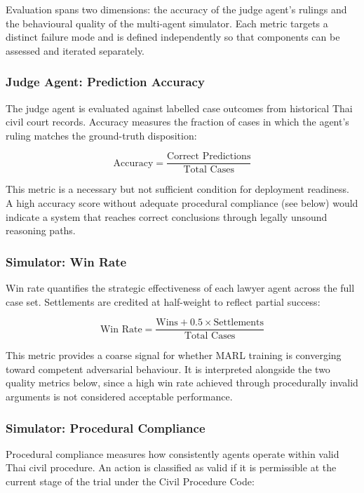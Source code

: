 Evaluation spans two dimensions: the accuracy of the judge agent's rulings and the behavioural quality of the multi-agent simulator. Each metric targets a distinct failure mode and is defined independently so that components can be assessed and iterated separately.

\subsubsection*{Judge Agent: Prediction Accuracy}

The judge agent is evaluated against labelled case outcomes from historical Thai civil court records. Accuracy measures the fraction of cases in which the agent's ruling matches the ground-truth disposition:

\[
\text{Accuracy} = \frac{\text{Correct Predictions}}{\text{Total Cases}}
\]

This metric is a necessary but not sufficient condition for deployment readiness. A high accuracy score without adequate procedural compliance (see below) would indicate a system that reaches correct conclusions through legally unsound reasoning paths.

\subsubsection{Simulator: Win Rate}

Win rate quantifies the strategic effectiveness of each lawyer agent across the full case set. Settlements are credited at half-weight to reflect partial success:

\[
\text{Win Rate} = \frac{\text{Wins} + 0.5 \times \text{Settlements}}{\text{Total Cases}}
\]

This metric provides a coarse signal for whether MARL training is converging toward competent adversarial behaviour. It is interpreted alongside the two quality metrics below, since a high win rate achieved through procedurally invalid arguments is not considered acceptable performance.

\subsubsection{Simulator: Procedural Compliance}

Procedural compliance measures how consistently agents operate within valid Thai civil procedure. An action is classified as valid if it is permissible at the current stage of the trial under the Civil Procedure Code:

